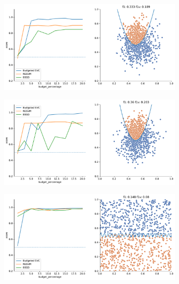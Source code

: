 \begin{figure}
    \begin{subfigure}{.5\textwidth}
        \centering
        \includegraphics[width=\textwidth]{img/comp_new/4.pdf}
    \end{subfigure}%
    \begin{subfigure}{.5\textwidth}
        \centering
        \includegraphics[width=\textwidth]{img/comp_new/5.pdf}
    \end{subfigure}
    \hfill
    \begin{subfigure}{.5\textwidth}
        \centering
        \includegraphics[width=\textwidth]{img/comp_new/7.pdf}

\end{subfigure}
\end{figure}
